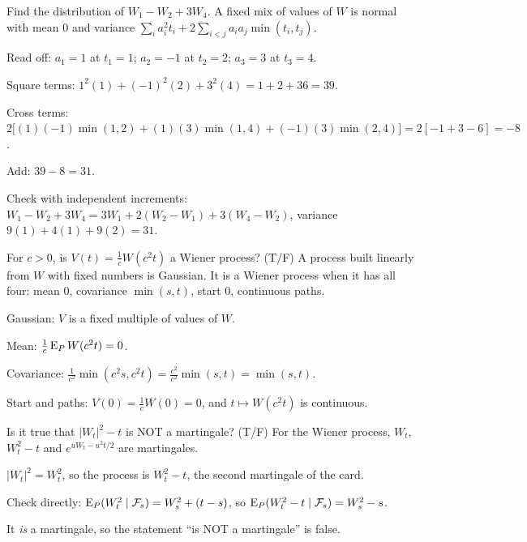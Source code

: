 \begin{problem}[Q1(d)]
Find the distribution of $W_1-W_2+3W_4$.
\cardsays A fixed mix of values of $W$ is normal with mean $0$ and variance $\sum_ia_i^2t_i+2\sum_{i<j}a_ia_j\min(t_i,t_j)$.
\working
\begin{steps}
\item Read off: $a_1=1$ at $t_1=1$; $a_2=-1$ at $t_2=2$; $a_3=3$ at $t_3=4$.
\item Square terms: $1^2(1)+(-1)^2(2)+3^2(4)=1+2+36=39$.
\item Cross terms: $2\big[(1)(-1)\min(1,2)+(1)(3)\min(1,4)+(-1)(3)\min(2,4)\big]=2[-1+3-6]=-8$.
\item Add: $39-8=31$.
\item Check with independent increments: $W_1-W_2+3W_4=3W_1+2(W_2-W_1)+3(W_4-W_2)$, variance $9(1)+4(1)+9(2)=31$.
\end{steps}
\end{problem}

\begin{problem}[Q1(e)]
For $c>0$, is $V(t)=\frac1cW(c^2t)$ a Wiener process? (T/F)
\cardsays A process built linearly from $W$ with fixed numbers is Gaussian. It is a Wiener process when it has all four: mean $0$, covariance $\min(s,t)$, start $0$, continuous paths.
\working
\begin{steps}
\item Gaussian: $V$ is a fixed multiple of values of $W$.
\item Mean: $\frac1c\operatorname{E}_PW(c^2t)=0$.
\item Covariance: $\frac1{c^2}\min(c^2s,c^2t)=\frac{c^2}{c^2}\min(s,t)=\min(s,t)$.
\item Start and paths: $V(0)=\frac1cW(0)=0$, and $t\mapsto W(c^2t)$ is continuous.
\end{steps}
\end{problem}

\begin{problem}[Q1(f)]
Is it true that $|W_t|^2-t$ is NOT a martingale? (T/F)
\cardsays For the Wiener process, $W_t$, $W_t^2-t$ and $e^{uW_t-u^2t/2}$ are martingales.
\working
\begin{steps}
\item $|W_t|^2=W_t^2$, so the process is $W_t^2-t$, the second martingale of the card.
\item Check directly: $\operatorname{E}_P(W_t^2\mid\mathcal F_s)=W_s^2+(t-s)$, so $\operatorname{E}_P(W_t^2-t\mid\mathcal F_s)=W_s^2-s$.
\item It \emph{is} a martingale, so the statement ``is NOT a martingale'' is false.
\end{steps}
\end{problem}

